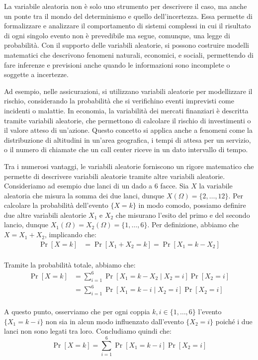 \documentclass[a4paper, 12pt]{report}
\begin{document}
    La variabile aleatoria non è solo uno strumento per descrivere il caso, ma anche un ponte tra il mondo del determinismo e quello dell'incertezza. Essa permette di formalizzare e analizzare il comportamento di sistemi complessi in cui il risultato di ogni singolo evento non è prevedibile ma segue, comunque, una legge di probabilità. Con il supporto delle variabili aleatorie, si possono costruire modelli matematici che descrivono fenomeni naturali, economici, e sociali, permettendo di fare inferenze e previsioni anche quando le informazioni sono incomplete o soggette a incertezze.

    Ad esempio, nelle assicurazioni, si utilizzano variabili aleatorie per modellizzare il rischio, considerando la probabilità che si verifichino eventi imprevisti come incidenti o malattie. In economia, la variabilità dei mercati finanziari è descritta tramite variabili aleatorie, che permettono di calcolare il rischio di investimenti o il valore atteso di un'azione. Questo concetto si applica anche a fenomeni come la distribuzione di altitudini in un'area geografica, i tempi di attesa per un servizio, o il numero di chiamate che un call center riceve in un dato intervallo di tempo.

    Tra i numerosi vantaggi, le variabili aleatorie forniscono un rigore matematico che permette di descrivere variabili aleatorie tramite altre variabili aleatorie. Consideriamo ad esempio due lanci di un dado a 6 facce. Sia $X$ la variabile aleatoria che misura la somma dei due lanci, dunque $X(\Omega) = \{2, \ldots, 12\}$. Per calcolare la probabilità dell'evento $\{X = k\}$ in modo comodo, possiamo definire due altre variabili aleatorie $X_1$ e $X_2$ che misurano l'esito del primo e del secondo lancio, dunque $X_1(\Omega) = X_2(\Omega) = \{1, \ldots, 6\}$. Per definizione, abbiamo che $X = X_1 + X_2$, implicando che:
    \[\begin{split}
        \Pr[X = k] &= \Pr[X_1 + X_2 = k] = \Pr[X_1 = k-X_2] \\
    \end{split}\]

    Tramite la probabilità totale, abbiamo che:
    \[\begin{split}
        \Pr[X = k] &= \sum_{i = 1}^6  \Pr[X_1 = k-X_2 \mid X_2 = i] \Pr[X_2 = i] \\
        &= \sum_{i = 1}^6  \Pr[X_1 = k-i \mid X_2 = i] \Pr[X_2 = i] \\
    \end{split}\]

    A questo punto, osserviamo che per ogni coppia $k,i \in \{1, \ldots, 6\}$ l'evento $\{X_1 = k-i\}$ non sia in alcun modo influenzato dall'evento $\{X_2 = i\}$ poiché i due lanci non sono legati tra loro. Concludiamo quindi che:
    \[\Pr[X = k] = \sum_{i = 1}^6  \Pr[X_1 = k-i] \Pr[X_2 = i]\]
    
\end{document}
